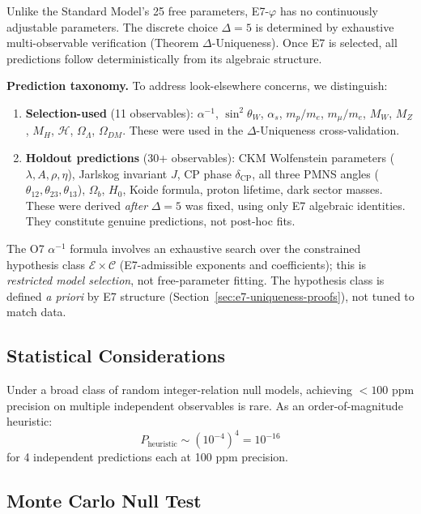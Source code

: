 \documentclass[11pt,a4paper]{article}
\begin{document}
Unlike the Standard Model's 25 free parameters, E7-$\varphi$ has no continuously adjustable parameters. The discrete choice $\Delta = 5$ is determined by exhaustive multi-observable verification (Theorem $\Delta$-Uniqueness). Once E7 is selected, all predictions follow deterministically from its algebraic structure.

\textbf{Prediction taxonomy.} To address look-elsewhere concerns, we distinguish:
\begin{enumerate}
\item \textbf{Selection-used} (11 observables): $\alpha^{-1}$, $\sin^2\theta_W$, $\alpha_s$, $m_p/m_e$, $m_\mu/m_e$, $M_W$, $M_Z$, $M_H$, $\mathcal{H}$, $\Omega_\Lambda$, $\Omega_{DM}$. These were used in the $\Delta$-Uniqueness cross-validation.
\item \textbf{Holdout predictions} (30+ observables): CKM Wolfenstein parameters ($\lambda, A, \rho, \eta$), Jarlskog invariant $J$, CP phase $\delta_{\text{CP}}$, all three PMNS angles ($\theta_{12}, \theta_{23}, \theta_{13}$), $\Omega_b$, $H_0$, Koide formula, proton lifetime, dark sector masses. These were derived \emph{after} $\Delta = 5$ was fixed, using only E7 algebraic identities. They constitute genuine predictions, not post-hoc fits.
\end{enumerate}
The O7 $\alpha^{-1}$ formula involves an exhaustive search over the constrained hypothesis class $\mathcal{E} \times \mathcal{C}$ (E7-admissible exponents and coefficients); this is \emph{restricted model selection}, not free-parameter fitting. The hypothesis class is defined \emph{a priori} by E7 structure (Section~\ref{sec:e7-uniqueness-proofs}), not tuned to match data.

\subsection{Statistical Considerations}

Under a broad class of random integer-relation null models, achieving $< 100$ ppm precision on multiple independent observables is rare. As an order-of-magnitude heuristic:
\begin{equation}
P_{\text{heuristic}} \sim (10^{-4})^4 = 10^{-16}
\end{equation}
for 4 independent predictions each at 100 ppm precision.

\subsection{Monte Carlo Null Test}
\end{document}

